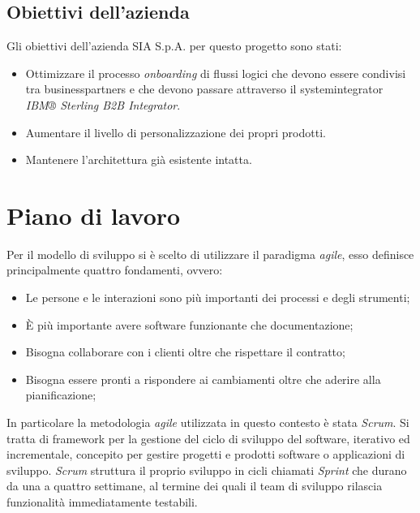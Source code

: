 \subsection{Obiettivi dell'azienda}
\label{subsec:obiettiviazienda}
Gli obiettivi dell'azienda SIA S.p.A. per questo progetto sono stati:

\begin{itemize}
    \item Ottimizzare il processo \textit{onboarding} di flussi logici che devono essere condivisi tra \glspl{businesspartner} e che devono passare attraverso il \gls{systemintegrator} \textit{IBM® Sterling B2B Integrator}.
    \item Aumentare il livello di personalizzazione dei propri prodotti.
    \item Mantenere l'architettura già esistente intatta.
\end{itemize}



\section{Piano di lavoro}
\label{sec:pianodilavoro}

Per il modello di sviluppo si è scelto di utilizzare il paradigma \textit{agile}, esso definisce principalmente quattro fondamenti, ovvero: \cite{agile} \cite{agilemanifesto}

\begin{itemize}
    \item Le persone e le interazioni sono più importanti dei processi e degli strumenti;
    \item È più importante avere software funzionante che documentazione;
    \item Bisogna collaborare con i clienti oltre che rispettare il contratto;
    \item Bisogna essere pronti a rispondere ai cambiamenti oltre che aderire alla pianificazione;
\end{itemize}


In particolare la metodologia \textit{agile} utilizzata in questo contesto è stata \textit{Scrum}. Si tratta di \gls{framework} per la gestione del ciclo di sviluppo del software, iterativo ed incrementale, concepito per gestire progetti e prodotti software o applicazioni di sviluppo. \textit{Scrum} struttura il proprio sviluppo in cicli chiamati \textit{Sprint} che durano da una a quattro settimane, al termine dei quali il team di sviluppo rilascia funzionalità immediatamente testabili.

